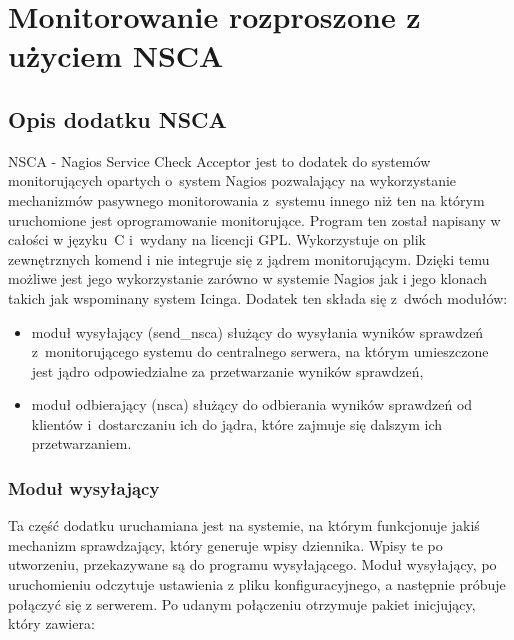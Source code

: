 \chapter{Monitorowanie rozproszone z użyciem NSCA}
\label{chap:nsca}

\section[Opis dodatku NSCA][Opis dodatku NSCA]{Opis dodatku NSCA}

NSCA - Nagios Service Check Acceptor jest to dodatek do systemów
monitorujących opartych o~system Nagios pozwalający na wykorzystanie
mechanizmów pasywnego monitorowania z~systemu innego niż ten na którym
uruchomione jest oprogramowanie monitorujące. Program ten został
napisany w całości w języku~C i~wydany na licencji GPL. Wykorzystuje
on plik zewnętrznych komend i nie integruje się z jądrem
monitorującym. Dzięki temu możliwe jest jego wykorzystanie zarówno w
systemie Nagios jak i jego klonach takich jak wspominany system
Icinga. Dodatek ten składa się z~dwóch modułów:

\begin{itemize}
\item moduł wysyłający (send\_nsca) służący do wysyłania wyników
  sprawdzeń z~monitorującego systemu do centralnego serwera, na którym
  umieszczone jest jądro odpowiedzialne za przetwarzanie wyników
  sprawdzeń,
\item moduł odbierający (nsca) służący do odbierania wyników sprawdzeń
  od klientów i~dostarczaniu ich do jądra, które zajmuje się dalszym
  ich przetwarzaniem.
\end{itemize}


\subsection[Moduł wysyłający][Moduł wysyłający]{Moduł wysyłający}
\label{subsec:modulWysylajacy}

Ta część dodatku uruchamiana jest na systemie, na którym funkcjonuje
jakiś mechanizm sprawdzający, który generuje wpisy dziennika. Wpisy te
po utworzeniu, przekazywane są do programu wysyłającego. Moduł
wysyłający, po uruchomieniu odczytuje ustawienia z pliku
konfiguracyjnego, a następnie próbuje połączyć się z serwerem. Po udanym
połączeniu otrzymuje pakiet inicjujący, który zawiera:

